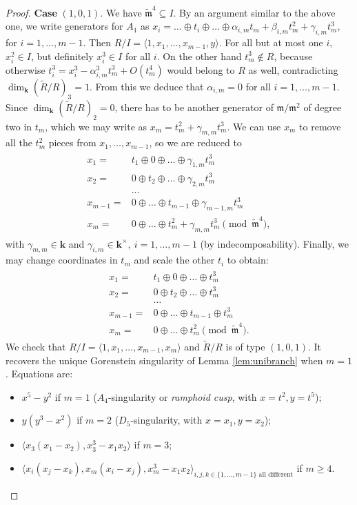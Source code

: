 \documentclass[11pt]{amsart}
\renewcommand{\k}{\mathbf k}
\newcommand{\m}{\mathfrak m}
\newcommand{\tR}{\widetilde{R}}
\newcommand{\tm}{\widetilde{\mathfrak m}}
\theoremstyle{plain}
\theoremstyle{definition}
\begin{document}
\begin{proof}
 \textbf{Case} $(1,0,1)$. We have $\tm^4\subseteq I$. By an argument similar to the above one, we write generators for $A_1$ as $x_i=\ldots\oplus t_i\oplus\ldots \oplus\alpha_{i,m}t_m+\beta_{i,m}t_m^2+\gamma_{i,m}t_m^3$, for $i=1,\ldots,m-1$.
 Then $R/I=\langle 1,x_1,\ldots,x_{m-1},y\rangle$. For all but at most one $i$, $x_i^2\in I$, but definitely $x_i^3\in I$ for all $i$. On the other hand $t_m^3\notin R$, because otherwise $t_i^3=x_i^3-\alpha_{i,m}^3t_m^3+O(t_m^4)$ would belong to $R$ as well, contradicting $\dim_\k(\tR/R)_3=1$. From this we deduce that $\alpha_{i,m}=0$ for all $i=1,\ldots,m-1$. Since $\dim_\k(\tR/R)_2=0$, there has to be another generator of $\m/\m^2$ of degree two in $t_m$, which we may write as $x_m=t_m^2+\gamma_{m,m}t_m^3$. We can use $x_m$ to remove all the $t_m^2$ pieces from $x_1,\ldots,x_{m-1}$, so we are reduced to
  \begin{align}\label{coordIII-cs}
 \begin{split}
  x_1= & t_1\oplus0\oplus\ldots\oplus \gamma_{1,m}t_m^3\\
  x_2= & 0\oplus t_2\oplus\ldots\oplus \gamma_{2,m}t_m^3\\
  &\ldots\\
  x_{m-1}= & 0\oplus\ldots\oplus t_{m-1}\oplus \gamma_{m-1,m}t_m^3\\
  x_m= & 0\oplus\ldots\oplus t_m^2+\gamma_{m,m}t_m^3 \pmod{\tm^4},
  \end{split}
 \end{align}
 with $\gamma_{m,m}\in\k$ and $\gamma_{i,m}\in\k^\times,\ i=1,\ldots,m-1$ (by indecomposability). Finally, we may change coordinates in $t_m$ and scale the other $t_i$ to obtain:
 \begin{align}\label{coordIII}
 \begin{split}
  x_1= & t_1\oplus0\oplus\ldots\oplus t_m^3\\
  x_2= & 0\oplus t_2\oplus\ldots\oplus t_m^3\\
  &\ldots\\
  x_{m-1}= & 0\oplus\ldots\oplus t_{m-1}\oplus t_m^3\\
  x_m= & 0\oplus\ldots\oplus t_m^2 \pmod{\tm^4}.
  \end{split}
 \end{align}
 We check that $R/I=\langle 1,x_1,\ldots,x_{m-1},x_m\rangle$ and $\tR/R$ is of type $(1,0,1)$. It recovers the unique Gorenstein singularity of Lemma \ref{lem:unibranch} when $m=1$. Equations are:
 \begin{itemize}
  \item $x^5-y^2$ if $m=1$ ($A_4$-singularity or \emph{ramphoid cusp}, with $x=t^2,y=t^5$);
  \item $y(y^3-x^2)$ if $m=2$ ($D_5$-singularity, with $x=x_1,y=x_2$);
  \item $\langle x_3(x_1-x_2),x_3^3-x_1x_2\rangle$ if $m=3$;
  \item $\langle x_i(x_j-x_k), x_m(x_i-x_j),x_m^3-x_1x_2\rangle_{i,j,k\in\{1,\ldots,m-1\}\text{ all different}}$ if $m\geq 4$.
 \end{itemize}
\end{proof}
\end{document}
